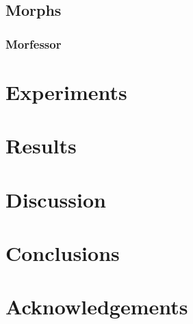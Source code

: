 \documentclass[10pt,b5paper]{article}
\begin{document}
\subsection{Morphs}

\subsubsection{Morfessor}


\section{Experiments} 

\section{Results}

\section{Discussion}

\section{Conclusions} 

\section{Acknowledgements} 


 
\end{document}
